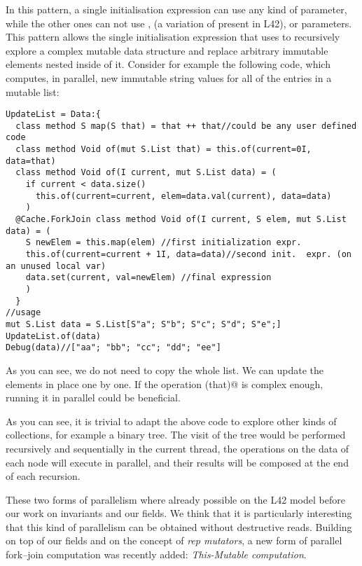 In this pattern, a single initialisation expression can use any kind of parameter, while the other ones can not 
use \Q@mut@, \Q@lent@ (a variation of \Q@mut@ present in L42), or \Q@read@ parameters.
This pattern allows the single initialisation expression that uses \Q@mut@ to recursively explore a complex mutable data structure and replace arbitrary immutable elements nested inside of it.
Consider for example the following code, which computes, in parallel,
new immutable string values for all of
the entries in a mutable list:

\begin{lstlisting}[deletekeywords=label]
UpdateList = Data:{
  class method S map(S that) = that ++ that//could be any user defined code
  class method Void of(mut S.List that) = this.of(current=0I, data=that)  
  class method Void of(I current, mut S.List data) = (
    if current < data.size() 
      this.of(current=current, elem=data.val(current), data=data)
    )
  @Cache.ForkJoin class method Void of(I current, S elem, mut S.List data) = (
    S newElem = this.map(elem) //first initialization expr.
    this.of(current=current + 1I, data=data)//second init.  expr. (on an unused local var)
    data.set(current, val=newElem) //final expression
    )
  }
//usage
mut S.List data = S.List[S"a"; S"b"; S"c"; S"d"; S"e";]
UpdateList.of(data)
Debug(data)//["aa"; "bb"; "cc"; "dd"; "ee"]
\end{lstlisting}
As you can see, we do not need to copy the whole list. We can update the elements in place one by one.
If the operation \Q@map(that)@ is complex enough, running it in parallel could be beneficial.

As you can see, it is trivial to adapt the above code to explore other kinds of collections, for example a binary tree.
The visit of the tree would be performed recursively and sequentially in the current thread, the operations on the data of each node will execute in parallel, and their results will be composed at the end of each recursion.

These two forms of parallelism where already possible on the L42 model before our work on invariants and our \Q@rep@ fields.
We think that it is particularly interesting that this kind of parallelism can be obtained without destructive reads.
Building on top of our \Q@rep@ fields and on the concept of \emph{rep mutators}, a new form of parallel fork--join computation was recently added:
\emph{This-Mutable computation}.

